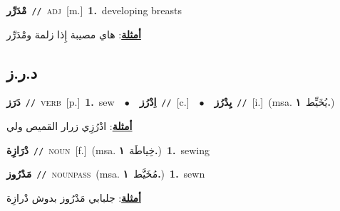 \documentclass[10pt,a4paper,twoside]{article} %
\begin{document}
\begin{multicols}{2}
{\setlength\topsep{0pt}\textbf{\foreignlanguage{arabic}{مْدَرِّر}}\ {\color{gray}\texttt{//}\color{black}}\ \textsc{adj}\ [m.]\ \textbf{1.}~developing breasts\  \begin{flushright}\color{gray}\foreignlanguage{arabic}{\textbf{\underline{\foreignlanguage{arabic}{أمثلة}}}: هاي مصيبة إِذا زلمة ومْدَرِّر}\end{flushright}\color{black}} \vspace{2mm}

\vspace{-3mm}
\subsection*{\color{blue}\foreignlanguage{arabic}{د.ر.ز}\color{blue}{}} 

{\setlength\topsep{0pt}\textbf{\foreignlanguage{arabic}{دَرَز}}\ {\color{gray}\texttt{//}\color{black}}\ \textsc{verb}\ [p.]\ \textbf{1.}~sew\ \ $\bullet$\ \ \setlength\topsep{0pt}\textbf{\foreignlanguage{arabic}{اِدْرُز}}\ {\color{gray}\texttt{//}\color{black}}\ [c.]\ \ $\bullet$\ \ \setlength\topsep{0pt}\textbf{\foreignlanguage{arabic}{يِدْرُز}}\ {\color{gray}\texttt{//}\color{black}}\ [i.]\ \color{gray}(msa. \foreignlanguage{arabic}{يُخَيِّط}~\foreignlanguage{arabic}{\textbf{١.}})\color{black}\  \begin{flushright}\color{gray}\foreignlanguage{arabic}{\textbf{\underline{\foreignlanguage{arabic}{أمثلة}}}: ادْرُزِي زرار القميص ولي}\end{flushright}\color{black}} \vspace{2mm}

{\setlength\topsep{0pt}\textbf{\foreignlanguage{arabic}{دْرَازِة}}\ {\color{gray}\texttt{//}\color{black}}\ \textsc{noun}\ [f.]\ \color{gray}(msa. \foreignlanguage{arabic}{خِياطَة}~\foreignlanguage{arabic}{\textbf{١.}})\color{black}\ \textbf{1.}~sewing\ } \vspace{2mm}

{\setlength\topsep{0pt}\textbf{\foreignlanguage{arabic}{مَدْرُوز}}\ {\color{gray}\texttt{//}\color{black}}\ \textsc{noun\textunderscore pass}\ \color{gray}(msa. \foreignlanguage{arabic}{مُخَيَّط}~\foreignlanguage{arabic}{\textbf{١.}})\color{black}\ \textbf{1.}~sewn\  \begin{flushright}\color{gray}\foreignlanguage{arabic}{\textbf{\underline{\foreignlanguage{arabic}{أمثلة}}}: جلبابي مَدْرُوز بدوش دْرازِة}\end{flushright}\color{black}} \vspace{2mm}


\end{multicols}
\end{document}
